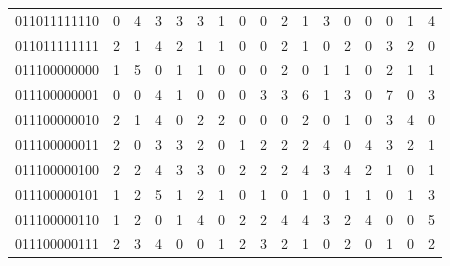 \documentclass[10pt,a4paper]{article}
\begin{document}
\begin{longtable}{ |c|c|c|c|c|c|c|c|c|c|c|c|c|c|c|c|c| }
    011011111110              & 0                            & 4                                & 3                            & 3                              & 3   & 1   & 0   & 0   & 2   & 1   & 3   & 0   & 0   & 0   & 1   & 4   \\
    011011111111              & 2                            & 1                                & 4                            & 2                              & 1   & 1   & 0   & 0   & 2   & 1   & 0   & 2   & 0   & 3   & 2   & 0   \\
    011100000000              & 1                            & 5                                & 0                            & 1                              & 1   & 0   & 0   & 0   & 2   & 0   & 1   & 1   & 0   & 2   & 1   & 1   \\
    011100000001              & 0                            & 0                                & 4                            & 1                              & 0   & 0   & 0   & 3   & 3   & 6   & 1   & 3   & 0   & 7   & 0   & 3   \\
    011100000010              & 2                            & 1                                & 4                            & 0                              & 2   & 2   & 0   & 0   & 0   & 2   & 0   & 1   & 0   & 3   & 4   & 0   \\
    011100000011              & 2                            & 0                                & 3                            & 3                              & 2   & 0   & 1   & 2   & 2   & 2   & 4   & 0   & 4   & 3   & 2   & 1   \\
    011100000100              & 2                            & 2                                & 4                            & 3                              & 3   & 0   & 2   & 2   & 2   & 4   & 3   & 4   & 2   & 1   & 0   & 1   \\
    011100000101              & 1                            & 2                                & 5                            & 1                              & 2   & 1   & 0   & 1   & 0   & 1   & 0   & 1   & 1   & 0   & 1   & 3   \\
    011100000110              & 1                            & 2                                & 0                            & 1                              & 4   & 0   & 2   & 2   & 4   & 4   & 3   & 2   & 4   & 0   & 0   & 5   \\
    011100000111              & 2                            & 3                                & 4                            & 0                              & 0   & 1   & 2   & 3   & 2   & 1   & 0   & 2   & 0   & 1   & 0   & 2   \\

\end{longtable}
\end{document}
